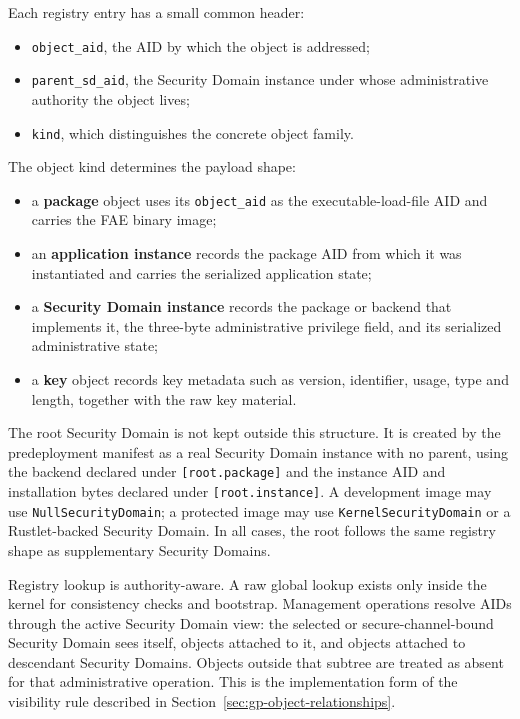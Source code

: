 Each registry entry has a small common header:
\begin{itemize}
\item \texttt{object\_aid}, the AID by which the object is addressed;
\item \texttt{parent\_sd\_aid}, the Security Domain instance under whose
  administrative authority the object lives;
\item \texttt{kind}, which distinguishes the concrete object family.
\end{itemize}

The object kind determines the payload shape:
\begin{itemize}
\item a \textbf{package} object uses its \texttt{object\_aid} as the
  executable-load-file AID and carries the FAE binary image;
\item an \textbf{application instance} records the package AID from which it
  was instantiated and carries the serialized application state;
\item a \textbf{Security Domain instance} records the package or backend that
  implements it, the three-byte administrative privilege field, and its
  serialized administrative state;
\item a \textbf{key} object records key metadata such as version, identifier,
  usage, type and length, together with the raw key material.
\end{itemize}

The root Security Domain is not kept outside this structure. It is created by
the predeployment manifest as a real Security Domain instance with no parent,
using the backend declared under \texttt{[root.package]} and the instance AID
and installation bytes declared under \texttt{[root.instance]}. A development
image may use \texttt{NullSecurityDomain}; a protected image may use
\texttt{KernelSecurityDomain} or a Rustlet-backed Security Domain. In all
cases, the root follows the same registry shape as supplementary Security
Domains.

Registry lookup is authority-aware. A raw global lookup exists only inside the
kernel for consistency checks and bootstrap. Management operations resolve AIDs
through the active Security Domain view: the selected or secure-channel-bound
Security Domain sees itself, objects attached to it, and objects attached to
descendant Security Domains. Objects outside that subtree are treated as absent
for that administrative operation. This is the implementation form of the
visibility rule described in Section~\ref{sec:gp-object-relationships}.

